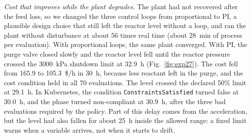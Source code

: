 \documentclass[conference]{IEEEtran}
\begin{document}
\textit{Cost that improves while the plant degrades.} The plant had not recovered after the feed loss, so we changed the three control loops from proportional to PI, a plausible design choice that still left the reactor level without a loop, and ran the plant without disturbance at about 56 times real time (about 28~min of process per evaluation). With proportional loops, the same plant converged. With PI, the purge valve closed slowly and the reactor level fell until the reactor pressure crossed the 3000~kPa shutdown limit at 32.9~h (Fig.~\ref{fig:exp27}). The cost fell from 165.9 to 105.3~\$/h in 30~h, because less reactant left in the purge, and the cost condition held in all 70 evaluations. The level crossed the declared 50\% limit at 29.1~h. In Kubernetes, the condition \texttt{ConstraintsSatisfied} turned false at 30.0~h, and the phase turned non-compliant at 30.9~h, after the three bad evaluations required by the policy. Part of this delay comes from the acceleration, but the level had also fallen for about 25~h inside the allowed range: a fixed limit warns when a variable arrives, not when it starts to drift.
\end{document}
